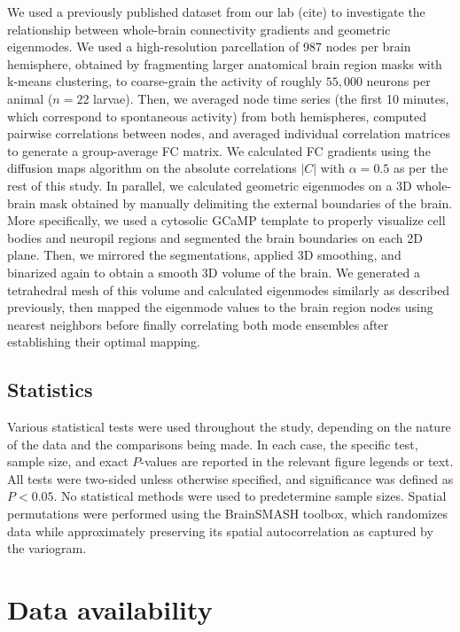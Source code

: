 \documentclass{article}
\begin{document}
We used a previously published dataset from our lab (cite) to investigate the relationship between whole-brain connectivity gradients and geometric eigenmodes. We used a high-resolution parcellation of 987 nodes per brain hemisphere, obtained by fragmenting larger anatomical brain region masks with k-means clustering, to coarse-grain the activity of roughly $55,000$ neurons per animal ($n=22$ larvae). Then, we averaged node time series (the first 10 minutes, which correspond to spontaneous activity) from both hemispheres, computed pairwise correlations between nodes, and averaged individual correlation matrices to generate a group-average FC matrix. We calculated FC gradients using the diffusion maps algorithm on the absolute correlations $|C|$ with $\alpha=0.5$ as per the rest of this study. In parallel, we calculated geometric eigenmodes on a 3D whole-brain mask obtained by manually delimiting the external boundaries of the brain. More specifically, we used a cytosolic GCaMP template to properly visualize cell bodies and neuropil regions and segmented the brain boundaries on each 2D plane. Then, we mirrored the segmentations, applied 3D smoothing, and binarized again to obtain a smooth 3D volume of the brain. We generated a tetrahedral mesh of this volume and calculated eigenmodes similarly as described previously, then mapped the eigenmode values to the brain region nodes using nearest neighbors before finally correlating both mode ensembles after establishing their optimal mapping.

\subsection*{Statistics}

Various statistical tests were used throughout the study, depending on the nature of the data and the comparisons being made. In each case, the specific test, sample size, and exact $P$-values are reported in the relevant figure legends or text. All tests were two-sided unless otherwise specified, and significance was defined as $P<0.05$. No statistical methods were used to predetermine sample sizes. Spatial permutations were performed using the BrainSMASH toolbox, which randomizes data while approximately preserving its spatial autocorrelation as captured by the variogram.

\section*{Data availability}
\end{document}
